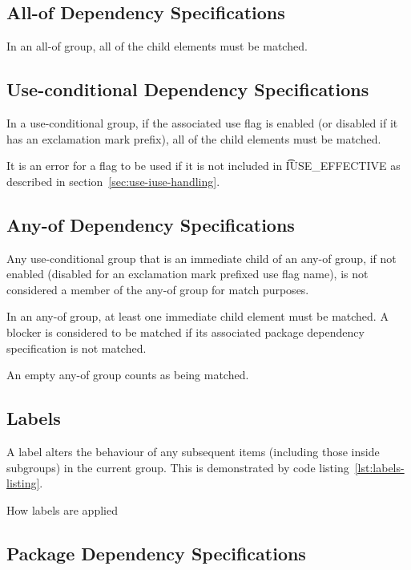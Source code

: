 \subsection{All-of Dependency Specifications}

In an all-of group, all of the child elements must be matched.

\subsection{Use-conditional Dependency Specifications}

In a use-conditional group, if the associated use flag is enabled (or disabled if it has an
exclamation mark prefix), all of the child elements must be matched.

It is an error for a flag to be used if it is not included in \t{IUSE\_EFFECTIVE} as described in
section~\ref{sec:use-iuse-handling}.

\subsection{Any-of Dependency Specifications}

Any use-conditional group that is an immediate child of an any-of group, if not enabled (disabled
for an exclamation mark prefixed use flag name), is not considered a member of the any-of group
for match purposes.

In an any-of group, at least one immediate child element must be matched. A blocker is
considered to be matched if its associated package dependency specification is not matched.

An empty any-of group counts as being matched.

\IFKDEBUILDELSE
{
    \subsection{Labels}
    \label{sec:labels}

    A label alters the behaviour of any subsequent items (including those inside subgroups) in the
    current group. This is demonstrated by code listing~\ref{lst:labels-listing}.

\begin{listing}
  \caption{How labels are applied}\label{lst:labels-listing}
  
\end{listing}
}{
}

\subsection{Package Dependency Specifications}

